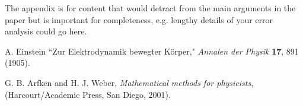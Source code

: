\documentclass[aps,pre,twocolumn,nofootinbib]{revtex4}
\begin{document}
The appendix is for content that would detract from the main arguments in the paper but is important for completeness, e.g. lengthy details of your error analysis could go here. 

%
 	\begin{thebibliography}{99}
%
 A. Einstein ``Zur Elektrodynamik bewegter K\"orper,"  \textit{Annalen der Physik} \textbf{17}, 891 (1905).

 G. B. Arfken and H. J. Weber, \textit{Mathematical methods for physicists},
  (Harcourt/Academic Press, San Diego, 2001).

%
	\end{thebibliography}
\end{document}
